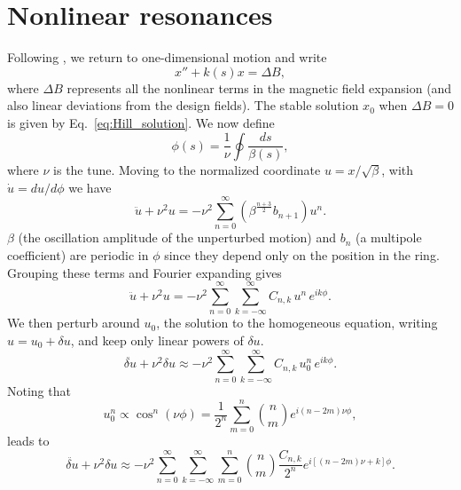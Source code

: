 \chapter{Nonlinear resonances} \label{app-A}


Following \cite{LundLecture1}, we return to one-dimensional motion and write
%
\begin{equation}\label{eq:Hill_nonlinear}
    x'' + k(s) x = \Delta B,
\end{equation}
%
where $\Delta B$ represents all the nonlinear terms in the magnetic field expansion (and also linear deviations from the design fields). The stable solution $x_0$ when $\Delta B = 0$ is given by Eq.~\eqref{eq:Hill_solution}. We now define
%
\begin{equation}
    \phi(s) = \frac{1}{\nu} \oint{\frac{ds}{\beta(s)}},
\end{equation}
%
where $\nu$ is the tune. Moving to the normalized coordinate $u = x / \sqrt{\beta}$, with $\dot{u} = du/d\phi$ we have
%
\begin{equation}\label{eq:pert1}
    \ddot{u} + \nu^2 u = -\nu^2 \sum_{n=0}^{\infty}{\left(\beta^{\frac{n+3}{2}} b_{n+1}\right) u^n}.
\end{equation}
%
$\beta$ (the oscillation amplitude of the unperturbed motion) and $b_n$ (a multipole coefficient) are periodic in $\phi$ since they depend only on the position in the ring. Grouping these terms and Fourier expanding gives
%
\begin{equation}
    \ddot{u} + \nu^2 u = -\nu^2 \sum_{n=0}^{\infty}\sum_{k=-\infty}^{\infty} C_{n,k} \, u^n \, e^{ik\phi}.
\end{equation} 
%
We then perturb around $u_0$, the solution to the homogeneous equation, writing $u = u_0 + \delta u$, and keep only linear powers of $\delta u$. 
%
\begin{equation}
    \ddot{\delta u} + \nu^2 \delta u \approx -\nu^2 \sum_{n=0}^{\infty}\sum_{k=-\infty}^{\infty} C_{n,k} \, u_0^n \, e^{ik\phi}.
\end{equation}
%
Noting that
%
\begin{equation}
    u_0^n \propto \cos^n(\nu\phi) = \frac{1}{2^n}\sum_{m=0}^{n} \binom{n}{m} e^{i(n-2m)\nu\phi},
\end{equation} 
%
leads to
%
\begin{equation}\label{eq:pert2}
    \ddot{\delta u} + \nu^2 \delta u \approx -\nu^2 \sum_{n=0}^{\infty}\sum_{k=-\infty}^{\infty} \sum_{m=0}^{n} {n \choose m} \frac{C_{n,k}}{2^n} e^{i\left[(n - 2m)\nu + k\right]\phi}.
\end{equation}
